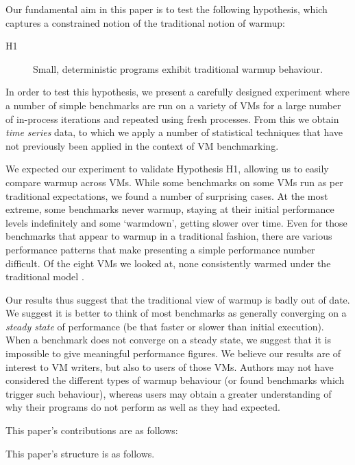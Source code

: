 \documentclass[10pt,preprint]{sigplanconf}
\newcommand{\hypone}{H1\xspace}
\begin{document}
Our fundamental aim in this paper is to test the following hypothesis, which captures a constrained
notion of the traditional notion of warmup:
\begin{description}
  \item[\hypone] Small, deterministic programs exhibit traditional warmup behaviour.
\end{description}
In order to test this hypothesis, we present a carefully designed
experiment where a number of simple benchmarks are run on a variety of
VMs for a large number of in-process iterations and repeated using fresh
processes. From this we obtain \emph{time series} data, to which we apply a
number of statistical techniques that have not previously been applied
in the context of VM benchmarking.

We expected our experiment to validate Hypothesis H1, allowing us to
easily compare warmup across VMs. While some benchmarks on some VMs run as per
traditional expectations, we found a number of surprising cases. At
the most extreme, some benchmarks never warmup, staying at their initial performance
levels indefinitely and some `warmdown', getting slower over time. Even for
those benchmarks that appear to warmup in a traditional fashion, there are
various performance patterns that make presenting a simple performance number
difficult. Of the eight VMs we looked at,
none consistently warmed under the traditional model .

Our results thus suggest that the traditional view of warmup is badly out of date. 
We suggest it is better to think of most benchmarks as
generally converging on a \emph{steady state} of performance (be that faster or
slower than initial execution). When a benchmark does not converge on a steady
state, we suggest that it is impossible to give meaningful performance figures.
We believe our results are of interest to VM writers, but also to users of
those VMs. Authors may not have considered the different types of warmup
behaviour (or found benchmarks which trigger such behaviour), whereas users may
obtain a greater understanding of why their programs do not perform as well as
they had expected.

This paper's contributions are as follows:
\begin{enumerate*}
  \item {}
\end{enumerate*}

This paper's structure is as follows. 
\end{document}
